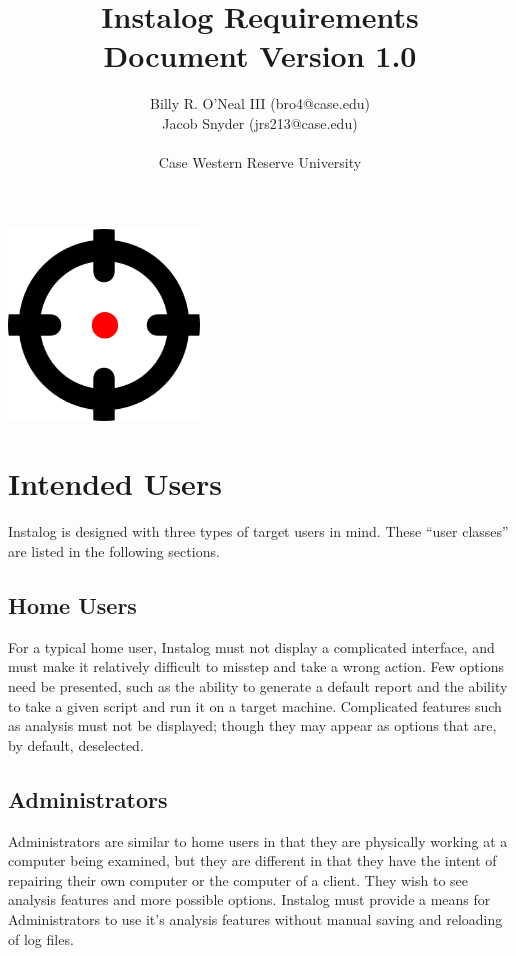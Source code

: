 \documentclass[letterpaper,12pt]{article}
\title{Instalog Requirements \\ Document Version 1.0}
\author{
Billy R. O'Neal III (bro4@case.edu) \\
Jacob Snyder (jrs213@case.edu) \\ \\
Case Western Reserve University
}
\begin{document}
\maketitle
\vspace{1in}
\begin{center}
\includegraphics[width=2in, height=2in]{figures/InstalogLogo.png}
\end{center}
\newpage



\tableofcontents
\newpage



\section{Intended Users} \label{users}
Instalog is designed with three types of target users in mind. These ``user
classes'' are listed in the following sections.

\subsection{Home Users}
For a typical home user, Instalog must not display a complicated interface, and
must make it relatively difficult to misstep and take a wrong action. Few
options need be presented, such as the ability to generate a default report and
the ability to take a given script and run it on a target machine. Complicated
features such as analysis must not be displayed; though they may appear as
options that are, by default, deselected.

\subsection{Administrators}
Administrators are similar to home users in that they are physically working at
a computer being examined, but they are different in that they have the intent of
repairing their own computer or the computer of a client. They wish to see
analysis features and more possible options. Instalog must provide a means for
Administrators to use it's analysis features without manual saving and reloading
of log files.
\end{document}
